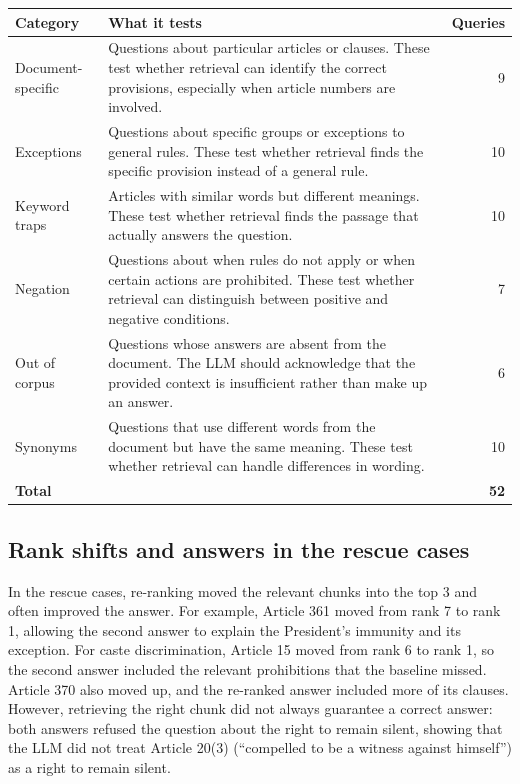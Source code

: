 \documentclass[11pt,a4paper]{article}
\begin{document}
\par\medskip\noindent\begin{minipage}{\linewidth}\centering\small
{}\label{tab:categories}
\begin{tabularx}{\linewidth}{@{}>{\raggedright\arraybackslash}p{2.6cm}Yr@{}}\toprule
Category & What it tests & Queries\\\midrule
Document-specific & Questions about particular articles or clauses. These test whether retrieval can identify the correct provisions, especially when article numbers are involved. & 9\\
Exceptions & Questions about specific groups or exceptions to general rules. These test whether retrieval finds the specific provision instead of a general rule. & 10\\
Keyword traps & Articles with similar words but different meanings. These test whether retrieval finds the passage that actually answers the question. & 10\\
Negation & Questions about when rules do not apply or when certain actions are prohibited. These test whether retrieval can distinguish between positive and negative conditions. & 7\\
Out of corpus & Questions whose answers are absent from the document. The LLM should acknowledge that the provided context is insufficient rather than make up an answer. & 6\\
Synonyms & Questions that use different words from the document but have the same meaning. These test whether retrieval can handle differences in wording. & 10\\\midrule
\textbf{Total} & & \textbf{52}\\\bottomrule
\end{tabularx}
\end{minipage}\par\medskip

\subsection{Rank shifts and answers in the rescue cases}
In the rescue cases, re-ranking moved the relevant chunks into the top 3 and often improved the answer. For example, Article 361 moved from rank 7 to rank 1, allowing the second answer to explain the President's immunity and its exception. For caste discrimination, Article 15 moved from rank 6 to rank 1, so the second answer included the relevant prohibitions that the baseline missed. Article 370 also moved up, and the re-ranked answer included more of its clauses. However, retrieving the right chunk did not always guarantee a correct answer: both answers refused the question about the right to remain silent, showing that the LLM did not treat Article 20(3) (``compelled to be a witness against himself'') as a right to remain silent.
\end{document}
